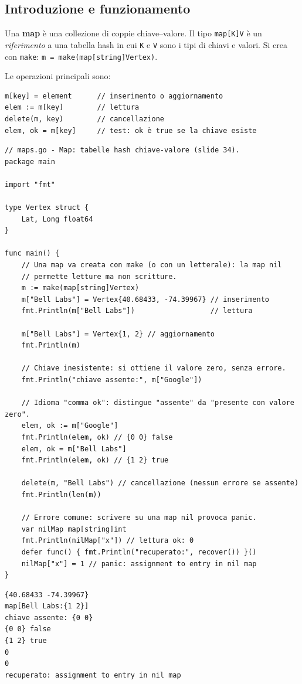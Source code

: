 \documentclass[11pt,a4paper]{report}
\newcommand{\cod}[1]{\texttt{#1}}
\begin{document}
\subsection{Introduzione e funzionamento}

Una \textbf{map} è una collezione di coppie chiave--valore. Il tipo
\cod{map[K]V} è un \emph{riferimento} a una tabella hash in cui \cod{K} e
\cod{V} sono i tipi di chiavi e valori. Si crea con \cod{make}:
\cod{m = make(map[string]Vertex)}.

Le operazioni principali sono:

\begin{lstlisting}[style=gocode,numbers=none]
m[key] = element      // inserimento o aggiornamento
elem := m[key]        // lettura
delete(m, key)        // cancellazione
elem, ok = m[key]     // test: ok è true se la chiave esiste
\end{lstlisting}

\begin{lstlisting}[style=gocode,caption={\texttt{04\_data\_structures/maps.go}}]
// maps.go - Map: tabelle hash chiave-valore (slide 34).
package main

import "fmt"

type Vertex struct {
	Lat, Long float64
}

func main() {
	// Una map va creata con make (o con un letterale): la map nil
	// permette letture ma non scritture.
	m := make(map[string]Vertex)
	m["Bell Labs"] = Vertex{40.68433, -74.39967} // inserimento
	fmt.Println(m["Bell Labs"])                  // lettura

	m["Bell Labs"] = Vertex{1, 2} // aggiornamento
	fmt.Println(m)

	// Chiave inesistente: si ottiene il valore zero, senza errore.
	fmt.Println("chiave assente:", m["Google"])

	// Idioma "comma ok": distingue "assente" da "presente con valore zero".
	elem, ok := m["Google"]
	fmt.Println(elem, ok) // {0 0} false
	elem, ok = m["Bell Labs"]
	fmt.Println(elem, ok) // {1 2} true

	delete(m, "Bell Labs") // cancellazione (nessun errore se assente)
	fmt.Println(len(m))

	// Errore comune: scrivere su una map nil provoca panic.
	var nilMap map[string]int
	fmt.Println(nilMap["x"]) // lettura ok: 0
	defer func() { fmt.Println("recuperato:", recover()) }()
	nilMap["x"] = 1 // panic: assignment to entry in nil map
}
\end{lstlisting}
\begin{lstlisting}[style=output]
{40.68433 -74.39967}
map[Bell Labs:{1 2}]
chiave assente: {0 0}
{0 0} false
{1 2} true
0
0
recuperato: assignment to entry in nil map
\end{lstlisting}
\end{document}
